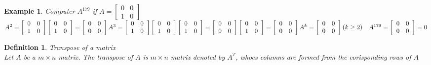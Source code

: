 \documentclass[a4paper,12pt,openany]{book}
\theoremstyle{defn}
\newtheorem{defn}{Definition}[section]
\theoremstyle{expl}
\newtheorem{expl}{Example}[section]
\begin{document}
\begin{expl}\textup{Computer $A^{179}$ if $A=\left[\begin{array}{cc}0&0\\1&0\end{array}\right]$\\}
$A^2=\left[\begin{array}{cc}0&0\\1&0\end{array}\right]\left[\begin{array}{cc}0&0\\1&0\end{array}\right]=\left[\begin{array}{cc}0&0\\0&0\end{array}\right]\\
A^3=\left[\begin{array}{cc}0&0\\1&0\end{array}\right]\left[\begin{array}{cc}0&0\\1&0\end{array}\right]\left[\begin{array}{cc}0&0\\1&0\end{array}\right]=\left[\begin{array}{cc}0&0\\0&0\end{array}\right]\left[\begin{array}{cc}0&0\\1&0\end{array}\right]=\left[\begin{array}{cc}0&0\\0&0\end{array}\right]\\
A^k = \left[\begin{array}{cc}0&0\\0&0\end{array}\right] (k \geq 2) \quad A^{179}=\left[\begin{array}{cc}0&0\\0&0\end{array}\right]=0$
\end{expl}
\begin{defn}\textup{Transpose of a matrix\\
Let $A$ be a $m\times n$ matrix. The transpose of $A$ is $m\times n$ matrix denoted by $A^T$, whoes columns are formed from the corisponding rows of $A$\\}
\end{defn}
\end{document}
